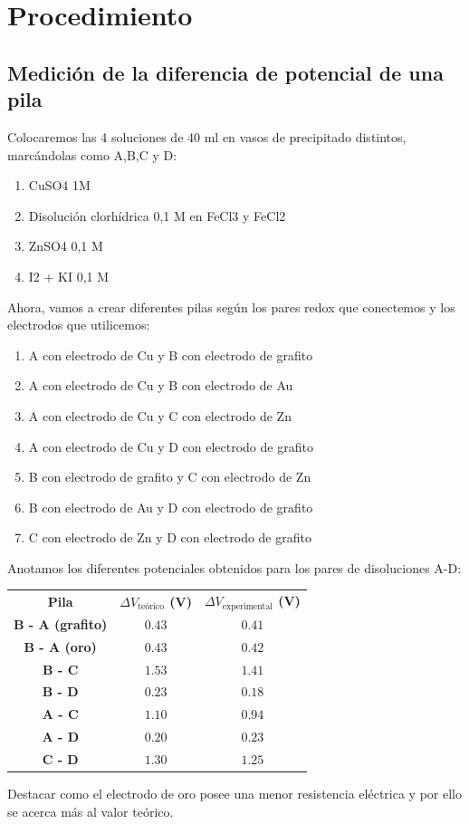 \clearpage

\section{Procedimiento}
\subsection{Medición de la diferencia de potencial de una pila}
\noindent Colocaremos las 4 soluciones de 40 \si{ml} en vasos de precipitado distintos, marcándolas como A,B,C y D:
\begin{enumerate}[A -]
\item CuSO4 1M
\item Disolución clorhídrica 0,1 M en FeCl3 y FeCl2
\item ZnSO4 0,1 M
\item I2 + KI 0,1 M
\end{enumerate}

\noindent Ahora, vamos a crear diferentes pilas según los pares redox que conectemos y los electrodos que utilicemos:

\begin{enumerate}
\item A con electrodo de Cu y B con electrodo de grafito
\item A con electrodo de Cu y B con electrodo de Au
\item A con electrodo de Cu y C con electrodo de Zn
\item A con electrodo de Cu y D con electrodo de grafito
\item B con electrodo de grafito y C con electrodo de Zn
\item B con electrodo de Au y D con electrodo de grafito
\item C con electrodo de Zn y D con electrodo de grafito
\end{enumerate}

\noindent Anotamos los diferentes potenciales obtenidos para los pares de disoluciones A-D:

\begin{table}[H]
\centering
\begin{tabular}{ccc}
\rowcolor[HTML]{9698ED} 
\textbf{Pila} & \textbf{$\Delta V_{\text{teórico}}$ (\si{V})} & \multicolumn{1}{l}{\cellcolor[HTML]{9698ED}\textbf{$\Delta V_{\text{experimental}}$ (\si{V})}} \\
\rowcolor[HTML]{DAE8FC} 
\textbf{B - A (grafito)} & $0.43$ & $0.41$ \\
\textbf{B - A (oro)} & $0.43$ & $0.42$ \\
\rowcolor[HTML]{DAE8FC} 
\textbf{B - C} & $1.53$ & $1.41$ \\
\textbf{B - D} & $0.23$ & $0.18$ \\
\rowcolor[HTML]{DAE8FC} 
\textbf{A - C} & $1.10$ & $0.94$ \\
\textbf{A - D} & $0.20$ & $0.23$ \\
\rowcolor[HTML]{DAE8FC} 
\textbf{C - D} & $1.30$ & $1.25$
\end{tabular}
\label{potencial}
\end{table}
\noindent Destacar como el electrodo de oro posee una menor resistencia eléctrica y por ello se acerca más al valor teórico.
\clearpage

